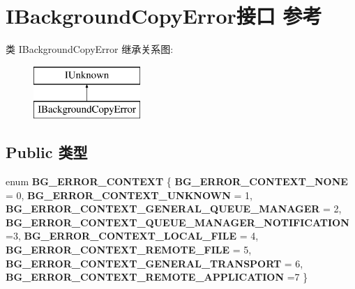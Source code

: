 \hypertarget{interface_i_background_copy_error}{}\section{I\+Background\+Copy\+Error接口 参考}
\label{interface_i_background_copy_error}
类 I\+Background\+Copy\+Error 继承关系图\+:\begin{figure}[H]
\begin{center}
\leavevmode
\includegraphics[height=2.000000cm]{interface_i_background_copy_error}
\end{center}
\end{figure}
\subsection*{Public 类型}
\begin{DoxyCompactItemize}
\item 
\mbox{\label{interface_i_background_copy_error_a0ac9860fbae4a59f1151154801beee62}} 
enum {\bfseries B\+G\+\_\+\+E\+R\+R\+O\+R\+\_\+\+C\+O\+N\+T\+E\+XT} \{ \newline
{\bfseries B\+G\+\_\+\+E\+R\+R\+O\+R\+\_\+\+C\+O\+N\+T\+E\+X\+T\+\_\+\+N\+O\+NE} = 0, 
{\bfseries B\+G\+\_\+\+E\+R\+R\+O\+R\+\_\+\+C\+O\+N\+T\+E\+X\+T\+\_\+\+U\+N\+K\+N\+O\+WN} = 1, 
{\bfseries B\+G\+\_\+\+E\+R\+R\+O\+R\+\_\+\+C\+O\+N\+T\+E\+X\+T\+\_\+\+G\+E\+N\+E\+R\+A\+L\+\_\+\+Q\+U\+E\+U\+E\+\_\+\+M\+A\+N\+A\+G\+ER} = 2, 
{\bfseries B\+G\+\_\+\+E\+R\+R\+O\+R\+\_\+\+C\+O\+N\+T\+E\+X\+T\+\_\+\+Q\+U\+E\+U\+E\+\_\+\+M\+A\+N\+A\+G\+E\+R\+\_\+\+N\+O\+T\+I\+F\+I\+C\+A\+T\+I\+ON} =3, 
\newline
{\bfseries B\+G\+\_\+\+E\+R\+R\+O\+R\+\_\+\+C\+O\+N\+T\+E\+X\+T\+\_\+\+L\+O\+C\+A\+L\+\_\+\+F\+I\+LE} = 4, 
{\bfseries B\+G\+\_\+\+E\+R\+R\+O\+R\+\_\+\+C\+O\+N\+T\+E\+X\+T\+\_\+\+R\+E\+M\+O\+T\+E\+\_\+\+F\+I\+LE} = 5, 
{\bfseries B\+G\+\_\+\+E\+R\+R\+O\+R\+\_\+\+C\+O\+N\+T\+E\+X\+T\+\_\+\+G\+E\+N\+E\+R\+A\+L\+\_\+\+T\+R\+A\+N\+S\+P\+O\+RT} = 6, 
{\bfseries B\+G\+\_\+\+E\+R\+R\+O\+R\+\_\+\+C\+O\+N\+T\+E\+X\+T\+\_\+\+R\+E\+M\+O\+T\+E\+\_\+\+A\+P\+P\+L\+I\+C\+A\+T\+I\+ON} =7
 \}
\end{DoxyCompactItemize}

